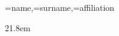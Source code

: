 \documentclass{article}
\begin{document}
{\name=name,\surname=surname,\affiliation=affiliation}
 {
    \BgThispage
    \topskip21.8em
    \begin{center}
    \calligra
    {\fontsize{50}{60}\selectfont \name~\surname}
    \end{center}
    \vspace*{\fill}
    \newpage
 }
\end{document}
